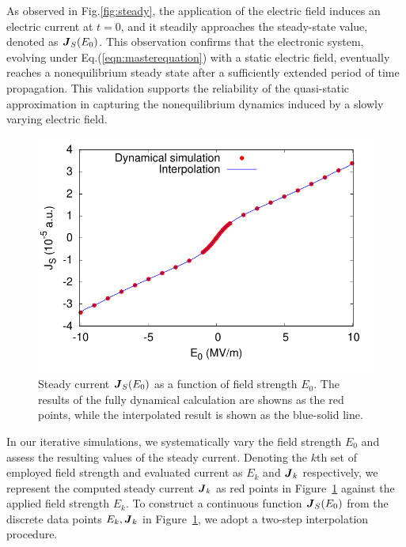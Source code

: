 As observed in Fig.\ref{fig:steady}, the application of the electric field induces an electric current at $t=0$, and it steadily approaches the steady-state value, denoted as $\boldsymbol J_S(E_0)$. This observation confirms that the electronic system, evolving under Eq.(\ref{eqn:masterequation}) with a static electric field, eventually reaches a nonequilibrium steady state after a sufficiently extended period of time propagation. This validation supports the reliability of the quasi-static approximation in capturing the nonequilibrium dynamics induced by a slowly varying electric field.
\begin{figure}[htb]
    \centering
\includegraphics[width=0.8\linewidth]{pic/jsteady_interpolate.pdf}
\caption{\label{fig:insert} 
Steady current $\boldsymbol J_S(E_0)$ as a function of field strength $E_0$. The results of the fully dynamical calculation are showns as the red points, while the interpolated result is shown as the blue-solid line.}
\end{figure}

In our iterative simulations, we systematically vary the field strength $E_0$ and assess the resulting values of the steady current. Denoting the $k$th set of employed field strength and evaluated current as $E_k$ and $\boldsymbol J_k$ respectively, we represent the computed steady current $\boldsymbol J_k$ as red points in Figure~\ref{fig:insert} against the applied field strength $E_k$. To construct a continuous function $\boldsymbol J_S(E_0)$ from the discrete data points ${E_k, \boldsymbol J_k}$ in Figure~\ref{fig:insert}, we adopt a two-step interpolation procedure.

